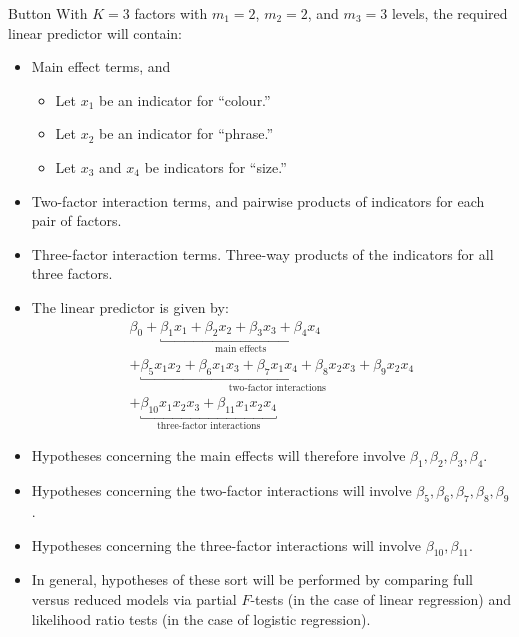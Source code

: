 \begin{Example}{Button}{}
      With $ K=3 $ factors with $ m_1=2 $, $ m_2=2 $, and $ m_3=3 $ levels, the required linear predictor will contain:
      \begin{itemize}
            \item Main effect terms, and
                  \begin{itemize}
                        \item Let $ x_1 $ be an indicator for ``colour.''
                        \item Let $ x_2 $ be an indicator for ``phrase.''
                        \item Let $ x_3 $ and $ x_4 $ be indicators for ``size.''
                  \end{itemize}
            \item Two-factor interaction terms, and pairwise products of indicators for each pair of factors.
            \item Three-factor interaction terms. Three-way products of the indicators for all three factors.
            \item The linear predictor is given by:
                  \begin{multline*}
                        \beta_0+\underbracket{\beta_1x_1+\beta_2x_2+\beta_3x_3+\beta_4x_4}_{\text{main effects}}\\
                        +\underbracket{\beta_5x_1x_2+\beta_6x_1x_3+\beta_7x_1x_4+\beta_8x_2x_3+\beta_9x_2x_4}_{\text{two-factor interactions}}\\
                        +\underbracket{\beta_{10}x_1x_2x_3+\beta_{11}x_1x_2x_4}_{\text{three-factor interactions}}
                  \end{multline*}
            \item Hypotheses concerning the main effects will therefore involve $ \beta_1,\beta_2,\beta_3,\beta_4 $.
            \item Hypotheses concerning the two-factor interactions will involve $ \beta_5,\beta_6,\beta_7,\beta_8,\beta_9 $.
            \item Hypotheses concerning the three-factor interactions will involve $ \beta_{10},\beta_{11} $.
      \end{itemize}
\end{Example}
\begin{itemize}
      \item In general, hypotheses of these sort will be performed by comparing full versus reduced models via
            partial $F$-tests (in the case of linear regression) and likelihood ratio tests (in the case of logistic
            regression).
\end{itemize}
